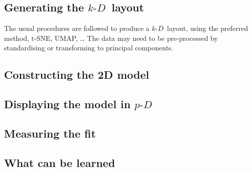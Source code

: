 \documentclass[
  12pt]{article}
\newcommand\pD{$p\text{-}D$\ }
\newcommand\kD{$k\text{-}D$\ }
\begin{document}
\subsection{\texorpdfstring{Generating the
\kD layout}{Generating the layout}}\label{generating-the-layout}

The usual procedures are followed to produce a \kD layout, using the
preferred method, t-SNE, UMAP, \ldots{} The data may need to be
pre-processed by standardising or transforming to principal components.

\subsection{Constructing the 2D model}\label{constructing-the-2d-model}

\subsection{\texorpdfstring{Displaying the model in
\pD}{Displaying the model in }}\label{displaying-the-model-in}

\subsection{Measuring the fit}\label{measuring-the-fit}

\subsection{What can be learned}\label{what-can-be-learned}
\end{document}
